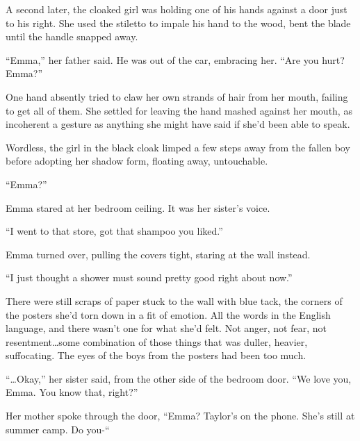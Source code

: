 A second later, the cloaked girl was holding one of his hands against a door just to his right.  She used the stiletto to impale his hand to the wood, bent the blade until the handle snapped away.



``Emma,'' her father said.  He was out of the car, embracing her.  ``Are you hurt?  Emma?''



One hand absently tried to claw her own strands of hair from her mouth, failing to get all of them.  She settled for leaving the hand mashed against her mouth, as incoherent a gesture as anything she might have said if she'd been able to speak.



Wordless, the girl in the black cloak limped a few steps away from the fallen boy before adopting her shadow form, floating away, untouchable.



\sectionbreak



``Emma?''



Emma stared at her bedroom ceiling.  It was her sister's voice.



``I went to that store, got that shampoo you liked.''



Emma turned over, pulling the covers tight, staring at the wall instead.



``I just thought a shower must sound pretty good right about now.''



There were still scraps of paper stuck to the wall with blue tack, the corners of the posters she'd torn down in a fit of emotion.  All the words in the English language, and there wasn't one for what she'd felt.  Not anger, not fear, not resentment\ldots some combination of those things that was duller, heavier, suffocating.  The eyes of the boys from the posters had been too much.



``\ldots{}Okay,'' her sister said, from the other side of the bedroom door.  ``We love you, Emma.  You know that, right?''



\sectionbreak



Her mother spoke through the door, ``Emma?  Taylor's on the phone.  She's still at summer camp.  Do you-``



